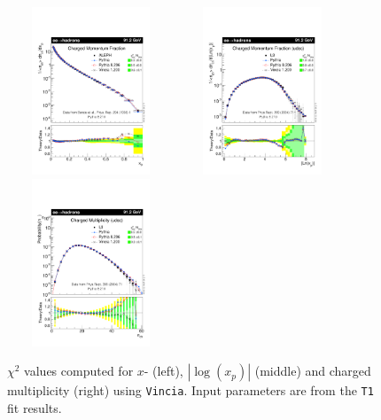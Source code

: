 \documentclass[aps,preprint,floatfix,nofootinbib,showpacs]{revtex4-1}
\begin{document}
 \begin{figure}[!h]
 \centering
 \includegraphics[width=5cm, height=5cm]{Vincia-T1/vincia03-x.pdf}
 \hfill
 \includegraphics[width=5cm, height=5cm]{Vincia-T1/vincia03-Lnx.pdf}
 \hfill
 \includegraphics[width=5cm, height=5cm]{Vincia-T1/vincia03-Nch.pdf}
 \caption{$\chi^2$ values computed for $x$- (left), $|\log(x_p)|$ (middle) and charged multiplicity (right) using
 \texttt{Vincia}. Input parameters are from the \texttt{T1} fit results.}
 \label{Chi2-1}
 \end{figure}
 
\end{document}
